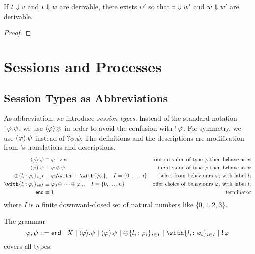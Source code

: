 
    \begin{theorem}
     If $t\Downarrow v$ and $t\Downarrow w$ are derivable,
     there exists $w'$ so that
     $v\Downarrow w'$ and $w\Downarrow w'$ are derivable.
    \end{theorem}
    \begin{proof}
    \end{proof}

    \section{Sessions and Processes}

    \subsection{Session Types as Abbreviations}

    As abbreviation, we introduce \textit{session
    types}.
    Instead of the standard notation $\mathop{!}\varphi.\psi$, we use
    $\langle{\varphi}\rangle.{\psi}$ in order to avoid the confusion with
    $\mathop{!}\varphi$.
    For symmetry, we use $(\varphi).{\psi}$ instead of $?\phi.\psi$.
    The definitions and the descriptions are modification from
    \citet{wadler2012propositions}'s translations and descriptions.
    \begin{align*}
     \sendtype\phi\psi&\equiv \phi\limp\psi &\text{output value of type $\phi$ then behave as $\psi$} \\
     \recvtype\phi\psi&\equiv \phi\otimes\psi &\text{input value of type $\phi$ then behave as $\psi$}\\
     \oplus\{l_i\colon \phi_i\}_{i\in I} &\equiv {\phi_0}\with
     \cdots \with {\phi_n}, \quad I = \{0,\ldots,n\} & \text{select from behaviours
     $\phi_i$ with label $l_i$}\\
     \with\{l_i\colon \phi_i\}_{i\in I} &\equiv {\phi_0}\oplus
     \cdots \oplus {\phi_n}, \quad I = \{0,\ldots,n\}& \text{offer choice of
     behaviours $\phi_i$ with label $l_i$}
     \\
     \terminate &\equiv \one &\text{terminator}
    \end{align*}
    where $I$ is a finite downward-closed set of natural numbers like
    $\{0,1,2,3\}$.


    The grammar
    \[
     \phi,\psi ::= \terminate\mid X \mid \sendtype\phi\psi \mid
     \recvtype\phi\psi
     \mid \oplus\{l_i\colon\phi_i\}_{i\in I}
     \mid \with\{l_i\colon\phi_i\}_{i\in I}
     \mid \bang\phi
    \]
    covers all types.


